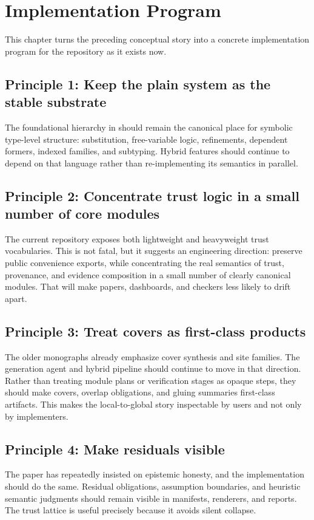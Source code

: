 \chapter{Implementation Program}

This chapter turns the preceding conceptual story into a concrete implementation program
for the repository as it exists now.

\section*{Principle 1: Keep the plain system as the stable substrate}
The foundational hierarchy in  should remain the canonical place for
symbolic type-level structure: substitution, free-variable logic, refinements, dependent
formers, indexed families, and subtyping. Hybrid features should continue to depend on
that language rather than re-implementing its semantics in parallel.

\section*{Principle 2: Concentrate trust logic in a small number of core modules}
The current repository exposes both lightweight and heavyweight trust vocabularies. This is
not fatal, but it suggests an engineering direction: preserve public convenience exports,
while concentrating the real semantics of trust, provenance, and evidence composition in a
small number of clearly canonical modules. That will make papers, dashboards, and checkers
less likely to drift apart.

\section*{Principle 3: Treat covers as first-class products}
The older monographs already emphasize cover synthesis and site families. The generation
agent and hybrid pipeline should continue to move in that direction. Rather than treating
module plans or verification stages as opaque steps, they should make covers, overlap
obligations, and gluing summaries first-class artifacts. This makes the local-to-global
story inspectable by users and not only by implementers.

\section*{Principle 4: Make residuals visible}
The paper has repeatedly insisted on epistemic honesty, and the implementation should do
the same. Residual obligations, assumption boundaries, and heuristic semantic judgments
should remain visible in manifests, renderers, and reports. The trust lattice is useful
precisely because it avoids silent collapse.

